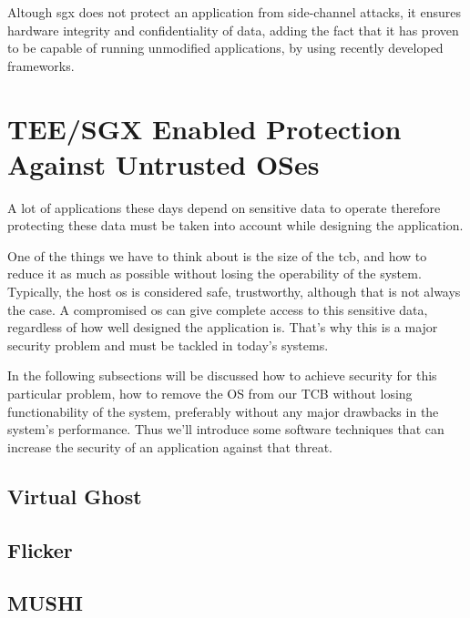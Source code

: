 Altough \gls{sgx} does not protect an application from side-channel attacks, it ensures hardware integrity and confidentiality of data, adding the fact that it has proven to be capable of running unmodified applications, by using recently developed frameworks.






\section{TEE/SGX Enabled Protection Against Untrusted OSes} %
\label{sec:tee_enabled_frameworks}

A lot of applications these days depend on sensitive data to operate therefore protecting these data must be taken into account while designing the application. 

One of the things we have to think about is the size of the \gls{tcb}, and how to reduce it as much as possible without losing the operability of the system. Typically, the host \gls{os} is considered safe, trustworthy, although that is not always the case. A compromised \gls{os} can give complete access to this sensitive data, regardless of how well designed the application is. That's why this is a major security problem and must be tackled in today's systems. 

In the following subsections will be discussed how to achieve security for this particular problem, how to remove the OS from our TCB without losing functionability of the system, preferably without any major drawbacks in the system's performance. Thus we'll introduce some software techniques that can increase the security of an application against that threat.

\subsection{Virtual Ghost}
\label{ssec:virtghost}

\subsection{Flicker}
\label{ssec:flicker}


\subsection{MUSHI}
\label{ssec:mushi}


